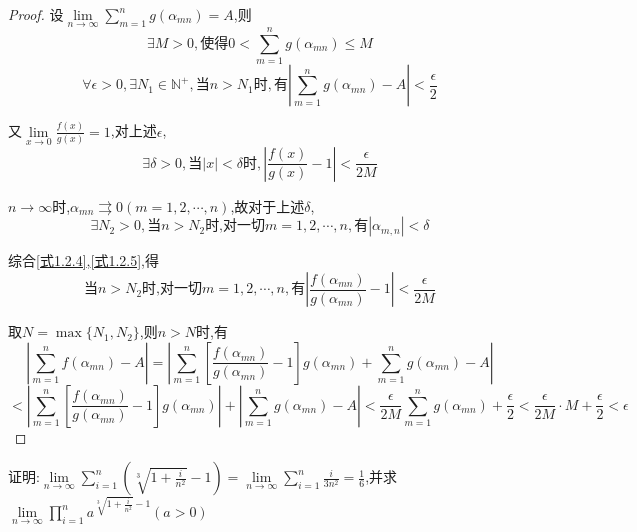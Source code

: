 \begin{proof}
    设$\lim \limits_{n \to \infty} \sum\limits_{m=1}^{n} g(\alpha_{mn})=A$,则
    \begin{equation}
        \exists M>0,\mbox{使得}0<\sum\limits_{m=1}^{n} g(\alpha_{mn})\le M
    \end{equation}
    \begin{equation}
        \forall \epsilon>0,\exists N_1\in \mathbb{N}^+,\mbox{当}n>N_1\mbox{时},\mbox{有}|\sum\limits_{m=1}^{n} g(\alpha_{mn})-A|<\frac{\epsilon}{2}
    \end{equation}

    又$\lim \limits_{x \to 0} \frac{f(x)}{g(x)}=1$,对上述$\epsilon$, 
    \begin{equation}\label{式1.2.4}
        \exists \delta>0,\mbox{当}|x|<\delta\mbox{时},|\frac{f(x)}{g(x)}-1|<\frac{\epsilon}{2M}
    \end{equation}

    $n\to \infty$时,$\alpha_{mn} \rightrightarrows 0(m=1,2,\cdots,n)$,故对于上述$\delta$,
    \begin{equation}\label{式1.2.5}
        \exists N_2>0,\mbox{当}n>N_2\mbox{时,对一切}m=1,2,\cdots,n,\mbox{有}|\alpha_{m,n}|<\delta
    \end{equation}

    综合\cref{式1.2.4},\cref{式1.2.5},得
    $$\mbox{当}n>N_2\mbox{时,对一切}m=1,2,\cdots,n,\mbox{有}|\frac{f(\alpha_{mn})}{g(\alpha_{mn})}-1|<\frac{\epsilon}{2M}$$

    取$N=\max\{N_1,N_2\}$,则$n>N$时,有$$|\sum\limits_{m=1}^{n} f(\alpha_{mn})-A|
    =|\sum\limits_{m=1}^{n} [\frac{f(\alpha_{mn})}{g(\alpha_{mn})}-1]g(\alpha_{mn}) + \sum\limits_{m=1}^{n} g(\alpha_{mn})-A|$$
    $$<|\sum\limits_{m=1}^{n} [\frac{f(\alpha_{mn})}{g(\alpha_{mn})}-1]g(\alpha_{mn})|+|\sum\limits_{m=1}^{n} g(\alpha_{mn})-A|
    <\frac{\epsilon}{2M} \sum\limits_{m=1}^{n} g(\alpha_{mn})+\frac{\epsilon}{2}<\frac{\epsilon}{2M}\cdot M+\frac{\epsilon}{2}<\epsilon$$
\end{proof}

\begin{exercise}
    证明:$\lim \limits_{n \to \infty} \sum\limits_{i=1}^{n} (\sqrt[3]{1+\frac{i}{n^2}}-1)=\lim \limits_{n \to \infty} \sum\limits_{i=1}^{n} \frac{i}{3n^2}=\frac{1}{6}$,并求$\lim \limits_{n \to \infty} \prod \limits_{i=1}^{n} a^{\sqrt[3]{1+\frac{i}{n^2}}-1}(a>0)$
\end{exercise}

